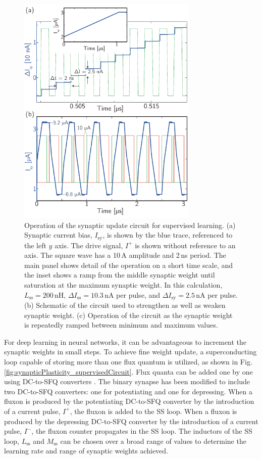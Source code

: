 \documentclass[aip,amsmath,amssymb,reprint,nofootinbib]{revtex4-1}
\begin{document}
\begin{figure}[t!]
	\centerline{\includegraphics[width=8.6cm]{_synapticPlasticity_supervised_small.pdf}}
	\caption{\label{fig:synapticPlasticity_supervised} Operation of the synaptic update circuit for supervised learning. (a) Synaptic current bias, $I_{\mathrm{sy}}$, is shown by the blue trace, referenced to the left $y$ axis. The drive signal, $I^+$ is shown without reference to an axis. The square wave has a 10\,\textmu A amplitude and 2\,ns period. The main panel shows detail of the operation on a short time scale, and the inset shows a ramp from the middle synaptic weight until saturation at the maximum synaptic weight. In this calculation, $L_{\mathrm{ss}} = 200$\,nH, $\Delta I_{\mathrm{ss}} = 10.3$\,nA per pulse, and $\Delta I_{\mathrm{sy}} = 2.5$\,nA per pulse. (b) Schematic of the circuit used to strengthen as well as weaken synaptic weight. (c) Operation of the circuit as the synaptic weight is repeatedly ramped between minimum and maximum values.}
\end{figure}
For deep learning in neural networks, it can be advantageous to increment the synaptic weights in small steps. To achieve fine weight update, a superconducting loop capable of storing more than one flux quantum is utilized, as shown in Fig.\,\ref{fig:synapticPlasticity_supervisedCircuit}. Flux quanta can be added one by one using DC-to-SFQ converters \cite{ka1999,vatu1998}. The binary synapse has been modified to include two DC-to-SFQ converters: one for potentiating and one for depressing.  When a fluxon is produced by the potentiating DC-to-SFQ converter by the introduction of a current pulse, $I^+$, the fluxon is added to the SS loop. When a fluxon is produced by the depressing DC-to-SFQ converter by the introduction of a current pulse, $I^-$, the fluxon counter propagates in the SS loop. The inductors of the SS loop, $L_{\mathrm{ss}}$ and $M_{\mathrm{ss}}$ can be chosen over a broad range of values to determine the learning rate and range of synaptic weights achieved.
\end{document}
